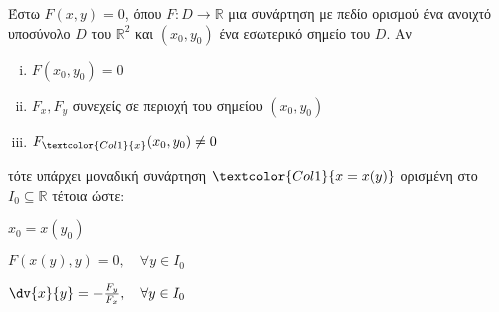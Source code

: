 Έστω $ F(x,y) = 0 $, όπου $ F\colon D \to \mathbb{R} $ μια συνάρτηση με πεδίο
ορισμού ένα ανοιχτό υποσύνολο $D$ του $\mathbb{R}^{2}$ και $ (x_0,y_0) $ ένα 
εσωτερικό σημείο του $D$.  Αν 
\begin{enumerate}[(i)]
  \item $F(x_0,y_0) = 0$ 
  \item $ F_x, F_y$ συνεχείς σε περιοχή του σημείου $ (x_0,y_0) $ 
  \item $ F_{\textcolor{Col1}{x}}(x_0,y_0) \neq 0 $
\end{enumerate}
τότε υπάρχει μοναδική συνάρτηση $ \textcolor{Col1}{x=x(y)} $ ορισμένη στο 
$ I_0 \subseteq \mathbb{R} $ τέτοια ώστε:
\begin{myitemize}
  \item $x_0 = x(y_0)$
  \item $F(x(y),y) = 0, \quad \forall y \in I_0$
  \item $ \dv{x}{y} = - \frac{F_y}{F_x}, \quad \forall y \in I_0  $
\end{myitemize}


